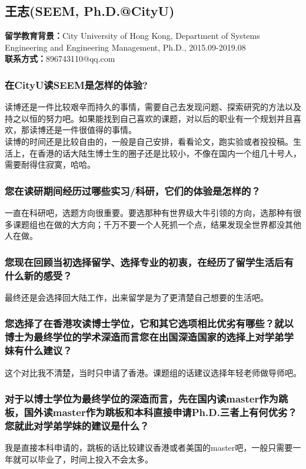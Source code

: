 \documentclass[a4paper,UTF8]{book}
\begin{document}
\clearpage
\subsection{王志(SEEM, Ph.D.@CityU)}
    \textbf{留学教育背景：}City University of Hong Kong, Department of Systems Engineering and Engineering Management, Ph.D., 2015.09-2019.08\\
    \textbf{联系方式：}896743110@qq.com

    \subsubsection*{在CityU读SEEM是怎样的体验?}
    读博还是一件比较艰辛而持久的事情，需要自己去发现问题、探索研究的方法以及持之以恒的努力吧。如果能找到自己喜欢的课题，对以后的职业有一个规划并且喜欢，那读博还是一件很值得的事情。\\
    读博的时间还是比较自由的，一般是自己安排，看看论文，跑实验或者投投稿。生活上，在香港的话大陆生博士生的圈子还是比较小，不像在国内一个组几十号人，需要耐得住寂寞，哈哈。
    
    \subsubsection*{您在读研期间经历过哪些实习/科研，它们的体验是怎样的？}
    一直在科研吧，选题方向很重要。要选那种有世界级大牛引领的方向，选那种有很多课题组也在做的大方向；千万不要一个人死抓一个点，结果发现全世界都没其他人在做。

    \subsubsection*{您现在回顾当初选择留学、选择专业的初衷，在经历了留学生活后有什么新的感受？}
    最终还是会选择回大陆工作，出来留学是为了更清楚自己想要的生活吧。
    
    \subsubsection*{您选择了在香港攻读博士学位，它和其它选项相比优劣有哪些？就以博士为最终学位的学术深造而言您在出国深造国家的选择上对学弟学妹有什么建议？}
    这个对比我不清楚，当时只申请了香港。课题组的话建议选择年轻老师做导师吧。

    \subsubsection*{对于以博士学位为最终学位的深造而言，先在国内读master作为跳板，国外读master作为跳板和本科直接申请Ph.D.三者上有何优劣？您就此对学弟学妹的建议是什么？}
    我是直接本科申请的，跳板的话比较建议香港或者美国的master吧，一般只需要一年就可以毕业了，时间上投入不会太多。
\end{document}
